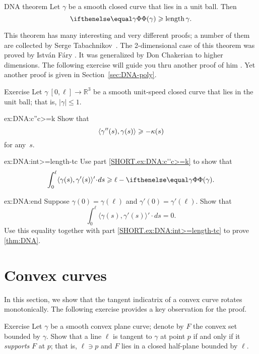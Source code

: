 \begin{thm}{DNA theorem}\label{thm:DNA}
Let $\gamma$ be a smooth closed curve that lies in a unit ball.
Then 
\[\tc\gamma\ge \length\gamma.\]

\end{thm}

This theorem has many interesting and very different proofs;
a number of them are collected by Serge Tabachnikov~\cite{tabachnikov}.
The 2-dimensional case of this theorem was proved by Istv\'{a}n F\'{a}ry \cite{fary1950}.
It was generalized by Don Chakerian \cite{chakerian1962} to higher dimensions.
The following exercise will guide you thru another proof of him \cite{chakerian1964}.
Yet another proof is given in Section~\ref{sec:DNA-poly}.

\begin{thm}{Exercise}\label{ex:DNA}
Let $\gamma\:[0,\ell]\to\mathbb{R}^3$ be a smooth unit-speed closed curve that lies in the unit ball; that is, $|\gamma|\le 1$.

\begin{subthm}{ex:DNA:c''c>=k}
Show that 
\[\langle\gamma''(s),\gamma(s)\rangle\geqslant-\kappa(s)\]
for any~$s$.
\end{subthm}

\begin{subthm}{ex:DNA:int>=length-tc}
Use part \ref{SHORT.ex:DNA:c''c>=k} to show that 
\[\int_0^\ell\langle\gamma(s),\gamma'(s)\rangle'\cdot ds\ge
\ell-\tc\gamma.\]

\end{subthm}

\begin{subthm}{ex:DNA:end}
Suppose $\gamma(0)=\gamma(\ell)$ and $\gamma'(0)=\gamma'(\ell)$.
Show that 
\[\int_0^\ell\langle\gamma(s),\gamma'(s)\rangle'\cdot ds=0.\]
Use this equality together with  part \ref{SHORT.ex:DNA:int>=length-tc} to prove \ref{thm:DNA}.
\end{subthm}
\end{thm}

\section{Convex curves}

In this section, we show that the tangent indicatrix of a convex curve rotates monotonically. 
The following exercise provides a key observation for the proof.

\begin{thm}{Exercise}\label{ex:tangent-support}
Let $\gamma$ be a smooth convex plane curve;
denote by $F$ the convex set bounded by $\gamma$.
Show that a line $\ell$ is tangent to $\gamma$ at point $p$ if and only if it \emph{supports} $F$ at $p$;
that is, $\ell\ni p$ and $F$ lies in a closed half-plane bounded by $\ell$.
\end{thm}

